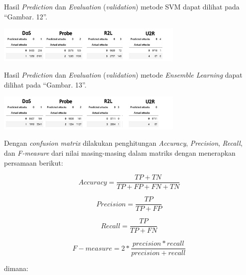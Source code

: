 \documentclass[conference]{IEEEtran}
\begin{document}
Hasil \emph{Prediction} dan \emph{Evaluation} (\emph{validation})
metode SVM dapat dilihat
pada ``Gambar. 12''.

\begin{minipage}{\linewidth}
\centerline{\includegraphics[width=90mm]{Gambar/Gbr009.jpg}}
\label{fig12}
\end{minipage}
\vspace{6pt}

Hasil \emph{Prediction} dan \emph{Evaluation} (\emph{validation})
metode \emph{Ensemble Learning} dapat dilihat
pada ``Gambar. 13''.

\begin{minipage}{\linewidth}
\centerline{\includegraphics[width=90mm]{Gambar/Gbr010.jpg}}
\label{fig13}
\end{minipage}
\vspace{6pt}

Dengan \emph{confusion matrix} dilakukan penghitungan \emph{Accuracy}, \emph{Precision}, \emph{Recall},
dan \emph{F-measure} dari nilai masing-masing dalam matriks dengan menerapkan persamaan berikut:

\begin{equation}
    Accuracy = \frac{TP + TN}{TP + FP + FN + TN}
    \label{eq6}
\end{equation}

\begin{equation}
    Precision = \frac{TP}{TP + FP}
    \label{eq7}
\end{equation}

\begin{equation}
    Recall = \frac{TP}{TP + FN}
    \label{eq8}
\end{equation}

\begin{equation}
    F-measure = 2 * \frac{precision * recall}{precision + recall}
    \label{eq9}
\end{equation}

\noindent dimana:
\end{document}
